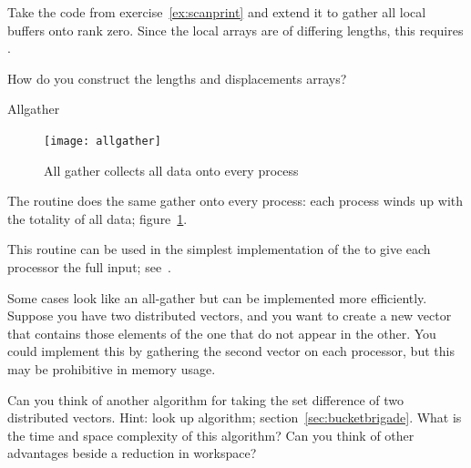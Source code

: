 \begin{exercise}
  \label{ex:scangather}
  Take the code from exercise~\ref{ex:scanprint} and extend it to gather
  all local buffers onto rank zero.
  Since the local arrays are of differing lengths,
  this requires .

  How do you construct the lengths and displacements arrays?
\end{exercise}

 {Allgather}

\begin{figure}[ht]
  \texttt{[image: allgather]}
  \caption{All gather collects all data onto every process}
  \label{fig:allgather}
\end{figure}

The  routine does the same gather onto
every process: each process winds up with the totality of all data;
figure~\ref{fig:allgather}.

This routine can be used in the simplest implementation of the 
%
 to give each processor the
full input; see~.

Some cases look like an all-gather but can be implemented more
efficiently. Suppose you have two distributed vectors, and you want to
create a new vector that contains those elements of the one that do
not appear in the other. You could implement this by gathering the
second vector on each processor, but this may be prohibitive in memory
usage.

\begin{exercise}
  Can you think of another algorithm for taking the set difference of
  two distributed vectors. Hint: look up  algorithm;
  section~\ref{sec:bucketbrigade}.
  What is the time and space complexity
  of this algorithm? Can you think of other advantages beside a
  reduction in workspace?
\end{exercise}
